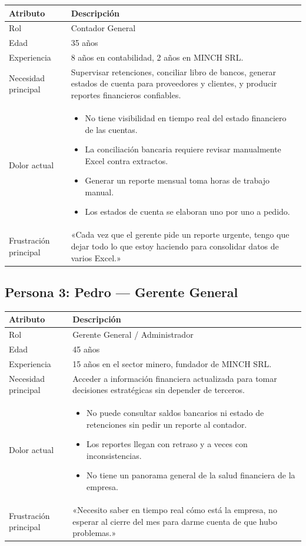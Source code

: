 \documentclass[stu]{apa7}
\begin{document}
\begin{longtable}{|L{3.5cm}|L{11cm}|}
\hline
{}
\textbf{Atributo} & \textbf{Descripción} \\
\hline
Rol & Contador General \\
\hline
Edad & 35 años \\
\hline
Experiencia & 8 años en contabilidad, 2 años en MINCH SRL. \\
\hline
Necesidad principal & Supervisar retenciones, conciliar libro de bancos, generar estados de cuenta para proveedores y clientes, y producir reportes financieros confiables. \\
\hline
Dolor actual & 
\begin{itemize}[nosep]
    \item No tiene visibilidad en tiempo real del estado financiero de las cuentas.
    \item La conciliación bancaria requiere revisar manualmente Excel contra extractos.
    \item Generar un reporte mensual toma horas de trabajo manual.
    \item Los estados de cuenta se elaboran uno por uno a pedido.
\end{itemize} \\
\hline
Frustración principal & «Cada vez que el gerente pide un reporte urgente, tengo que dejar todo lo que estoy haciendo para consolidar datos de varios Excel.» \\
\hline
\end{longtable}

\subsection{Persona 3: Pedro --- Gerente General}

\begin{longtable}{|L{3.5cm}|L{11cm}|}
\hline
{}
\textbf{Atributo} & \textbf{Descripción} \\
\hline
Rol & Gerente General / Administrador \\
\hline
Edad & 45 años \\
\hline
Experiencia & 15 años en el sector minero, fundador de MINCH SRL. \\
\hline
Necesidad principal & Acceder a información financiera actualizada para tomar decisiones estratégicas sin depender de terceros. \\
\hline
Dolor actual & 
\begin{itemize}[nosep]
    \item No puede consultar saldos bancarios ni estado de retenciones sin pedir un reporte al contador.
    \item Los reportes llegan con retraso y a veces con inconsistencias.
    \item No tiene un panorama general de la salud financiera de la empresa.
\end{itemize} \\
\hline
Frustración principal & «Necesito saber en tiempo real cómo está la empresa, no esperar al cierre del mes para darme cuenta de que hubo problemas.» \\
\hline
\end{longtable}
\end{document}
